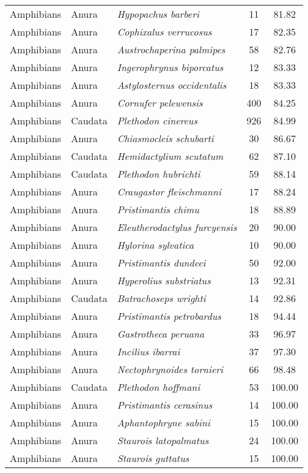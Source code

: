 \begin{longtable}{ll>{\itshape}lcc}
  Amphibians & Anura & Hypopachus barberi &  11 & 81.82 \\ 
  Amphibians & Anura & Cophixalus verrucosus &  17 & 82.35 \\ 
  Amphibians & Anura & Austrochaperina palmipes &  58 & 82.76 \\ 
  Amphibians & Anura & Ingerophrynus biporcatus &  12 & 83.33 \\ 
  Amphibians & Anura & Astylosternus occidentalis &  18 & 83.33 \\ 
  Amphibians & Anura & Cornufer pelewensis & 400 & 84.25 \\ 
  Amphibians & Caudata & Plethodon cinereus & 926 & 84.99 \\ 
  Amphibians & Anura & Chiasmocleis schubarti &  30 & 86.67 \\ 
  Amphibians & Caudata & Hemidactylium scutatum &  62 & 87.10 \\ 
  Amphibians & Caudata & Plethodon hubrichti &  59 & 88.14 \\ 
  Amphibians & Anura & Craugastor fleischmanni &  17 & 88.24 \\ 
  Amphibians & Anura & Pristimantis chimu &  18 & 88.89 \\ 
  Amphibians & Anura & Eleutherodactylus furcyensis &  20 & 90.00 \\ 
  Amphibians & Anura & Hylorina sylvatica &  10 & 90.00 \\ 
  Amphibians & Anura & Pristimantis dundeei &  50 & 92.00 \\ 
  Amphibians & Anura & Hyperolius substriatus &  13 & 92.31 \\ 
  Amphibians & Caudata & Batrachoseps wrighti &  14 & 92.86 \\ 
  Amphibians & Anura & Pristimantis petrobardus &  18 & 94.44 \\ 
  Amphibians & Anura & Gastrotheca peruana &  33 & 96.97 \\ 
  Amphibians & Anura & Incilius ibarrai &  37 & 97.30 \\ 
  Amphibians & Anura & Nectophrynoides tornieri &  66 & 98.48 \\ 
  Amphibians & Caudata & Plethodon hoffmani &  53 & 100.00 \\ 
  Amphibians & Anura & Pristimantis cerasinus &  14 & 100.00 \\ 
  Amphibians & Anura & Aphantophryne sabini &  15 & 100.00 \\ 
  Amphibians & Anura & Staurois latopalmatus &  24 & 100.00 \\ 
  Amphibians & Anura & Staurois guttatus &  15 & 100.00 \\ 

\end{longtable}
